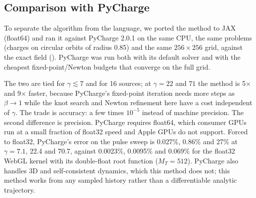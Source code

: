 \documentclass[11pt, a4paper]{article}
\begin{document}
\subsection{Comparison with PyCharge}
To separate the algorithm from the language, we ported the method to JAX (float64) and ran it against PyCharge 2.0.1 \cite{pycharge2022} on the same CPU, the same problems (charges on circular orbits of radius 0.85) and the same $256\times256$ grid, against the exact field (). PyCharge was run both with its default solver and with the cheapest fixed-point/Newton budgets that converge on the full grid.

\begin{table}[htbp]
\centering
{}
\caption{Float64 on a 2-core CPU, medians of three runs after compilation. PyCharge is exact when it converges ($10^{-11}$--$10^{-14}$); the method here interpolates a sampled history.}
\label{tab:pycharge}
\end{table}

The two are tied for $\gamma \lesssim 7$ and for 16 sources; at $\gamma = 22$ and $71$ the method is 5$\times$ and 9$\times$ faster, because PyCharge's fixed-point iteration needs more steps as $\beta \to 1$ while the knot search and Newton refinement here have a cost independent of $\gamma$. The trade is accuracy: a few times $10^{-5}$ instead of machine precision. The second difference is precision. PyCharge requires float64, which consumer GPUs run at a small fraction of float32 speed and Apple GPUs do not support. Forced to float32, PyCharge's error on the pulse sweep is 0.027\%, 0.86\% and 27\% at $\gamma = 7.1$, 22.4 and 70.7, against 0.0023\%, 0.0095\% and 0.069\% for the float32 WebGL kernel with its double-float root function ($M_T = 512$). PyCharge also handles 3D and self-consistent dynamics, which this method does not; this method works from any sampled history rather than a differentiable analytic trajectory.
\end{document}
